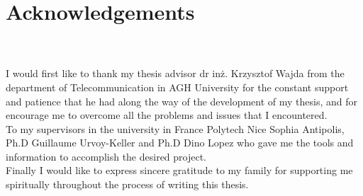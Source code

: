


\begingroup

\chapter*{Acknowledgements}
\\
\\

I would first like to thank my thesis advisor dr inż. Krzysztof Wajda from the department of Telecommunication in AGH University for the constant support and patience that he had along the way of the development of my thesis, and for encourage me to overcome all the problems and issues that I encountered.\\

To my supervisors in the university in France Polytech Nice Sophia Antipolis, Ph.D Guillaume Urvoy-Keller and Ph.D Dino Lopez who gave me the tools and information to accomplish the desired project.\\

Finally I would like to express sincere gratitude to my family for supporting me spiritually throughout the process of writing this thesis.\\

\endgroup
\vfill